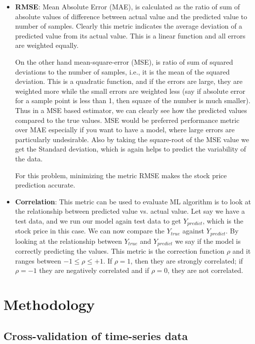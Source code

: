\documentclass[12pt]{article}
\begin{document}
\begin{itemize}
\begin{itemize}
\item {\bf RMSE}:  Mean Absolute Error (MAE), is calculated as the ratio of sum of absolute values of difference between actual value and the predicted value to number of samples. Clearly this metric indicates the average deviation of a predicted value from its actual value. This is a linear function and all errors are weighted equally.

On the other hand mean-square-error (MSE), is ratio of sum of squared deviations to the number of samples, i.e., it is the mean of the squared deviation. This is a quadratic function, and if the errors are large, they are weighted more while the small errors are weighted less (say if absolute error for a sample point is less than 1, then square of the number is much smaller). Thus in a MSE based estimator, we can clearly see how the predicted values compared to the true values. MSE would be preferred performance metric over MAE especially if you want to have a model, where large errors are particularly undesirable.  Also by taking the square-root of the MSE value we get the Standard deviation, which is again helps to predict the variability of the data. 

For this problem, minimizing the metric RMSE makes the stock price prediction accurate.

\item {\bf Correlation}: This metric can be used to evaluate ML algorithm is to look at the relationship between predicted value vs. actual value. Let say we have a test data, and we run our model again test data to get $Y_{predict}$, which is the stock price in this case. We can now compare the $Y_{true}$ against $Y_{predict}$. By looking at the relationship between  $Y_{true}$ and $Y_{predict}$ we say if the model is correctly predicting the values. This metric is the correction function $\rho$ and it ranges between $-1 \leq \rho \leq +1$. If $\rho=1$, then they are strongly correlated; if $\rho=-1$ they are negatively correlated and if $\rho=0$, they are not correlated. 

\end{itemize}


\section{Methodology}
\label{sec:method}

\subsection{Cross-validation of time-series data}


\end{itemize}
\end{document}
